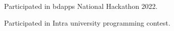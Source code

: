 \begin{zitemize}
\item Participated in bdapps National Hackathon 2022.
\item Participated in Intra university programming contest.
\end{zitemize}